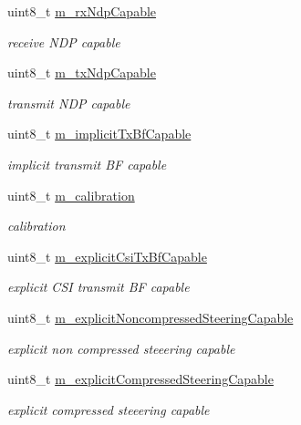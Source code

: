 \begin{DoxyCompactItemize}
uint8\+\_\+t \hyperlink{classns3_1_1HtCapabilities_a7039be4ac83036eb6b3fc100ee57fcc6}{m\+\_\+rx\+Ndp\+Capable}
\begin{DoxyCompactList}\small\item\em receive N\+DP capable \end{DoxyCompactList}\item 
uint8\+\_\+t \hyperlink{classns3_1_1HtCapabilities_a7e186a7bc6038344488f66095e186219}{m\+\_\+tx\+Ndp\+Capable}
\begin{DoxyCompactList}\small\item\em transmit N\+DP capable \end{DoxyCompactList}\item 
uint8\+\_\+t \hyperlink{classns3_1_1HtCapabilities_a607d92622d4723098cb0f94a1b470660}{m\+\_\+implicit\+Tx\+Bf\+Capable}
\begin{DoxyCompactList}\small\item\em implicit transmit BF capable \end{DoxyCompactList}\item 
uint8\+\_\+t \hyperlink{classns3_1_1HtCapabilities_a0176690dd0f5fd9568b4a8df0f2a587f}{m\+\_\+calibration}
\begin{DoxyCompactList}\small\item\em calibration \end{DoxyCompactList}\item 
uint8\+\_\+t \hyperlink{classns3_1_1HtCapabilities_af74335c78c6c9400e3766c853dd22f7a}{m\+\_\+explicit\+Csi\+Tx\+Bf\+Capable}
\begin{DoxyCompactList}\small\item\em explicit C\+SI transmit BF capable \end{DoxyCompactList}\item 
uint8\+\_\+t \hyperlink{classns3_1_1HtCapabilities_aa1b4195b8cbcd9c2d1189e862cfd694b}{m\+\_\+explicit\+Noncompressed\+Steering\+Capable}
\begin{DoxyCompactList}\small\item\em explicit non compressed steeering capable \end{DoxyCompactList}\item 
uint8\+\_\+t \hyperlink{classns3_1_1HtCapabilities_af8798433f1b66b1d04eb752d362b7fbf}{m\+\_\+explicit\+Compressed\+Steering\+Capable}
\begin{DoxyCompactList}\small\item\em explicit compressed steeering capable \end{DoxyCompactList}\item 

\end{DoxyCompactItemize}
